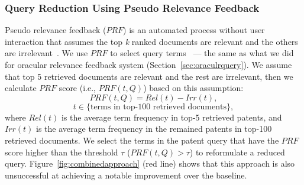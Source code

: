 \subsubsection{Query Reduction Using Pseudo Relevance Feedback}
Pseudo relevance feedback ($\mathit{PRF}$) is an automated process without user interaction that assumes the top \textit{k} ranked documents are relevant and the others are irrelevant~\citep{Baeza-Yates2011}. We use $\mathit{PRF}$ to select query terms~\citep{maxwell2013compact} --- the same as what we did for oracular relevance feedback system (Section~\ref{sec:oraculrquery}). We assume that top 5 retrieved documents are relevant and the rest are irrelevant, then we calculate $\mathit{PRF}$ score (i.e., $PRF(t,Q)$) based on this assumption:  
\begin{equation}
PRF(t,Q)=Rel(t)-Irr(t), 
 \label{eq:score-prf}
\end{equation}
\vspace*{-2ex}
\begin{displaymath}t\in \lbrace \mbox{terms in top-100 retrieved documents}\rbrace,\end{displaymath}
where $\mathit{Rel(t)}$ is the average term frequency in top-5 retrieved patents, and $\mathit{Irr(t)}$ is
the average term frequency in the remained patents in top-100 retrieved documents.
We select the terms in the patent query that have the $\mathit{PRF}$ score higher than the threshold $\tau$ ($PRF(t, Q)>\tau$) to reformulate a reduced query. Figure~\ref{fig:combinedapproach} (red line) shows that this approach is also unsuccessful at achieving a notable improvement over the baseline.
